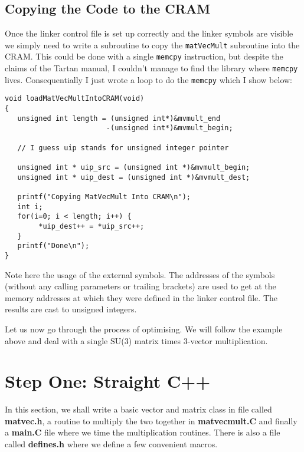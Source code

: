 \subsection{Copying the Code to the CRAM}
Once the linker control file is set up correctly and the linker
symbols are visible we simply need to write a subroutine to copy 
the {\tt matVecMult} subroutine  into the CRAM. This could be done with
a single {\tt memcpy} instruction, but despite the claims of the 
Tartan manual, I couldn't manage to find the library where {\tt memcpy}
lives. Consequentially I just wrote a loop to do the {\tt memcpy} which I
show below:
{\scriptsize
\begin{verbatim}
void loadMatVecMultIntoCRAM(void)
{
   unsigned int length = (unsigned int*)&mvmult_end
                        -(unsigned int*)&mvmult_begin;
	
   // I guess uip stands for unsigned integer pointer

   unsigned int * uip_src = (unsigned int *)&mvmult_begin;
   unsigned int * uip_dest = (unsigned int *)&mvmult_dest;

   printf("Copying MatVecMult Into CRAM\n");
   int i;
   for(i=0; i < length; i++) {
        *uip_dest++ = *uip_src++;
   }    
   printf("Done\n");
}
\end{verbatim}}

Note here the usage of the external symbols. The addresses of the 
symbols (without any calling parameters or trailing brackets) are 
used to get at the memory addresses at which they were defined in
the linker control file. The results are cast to unsigned integers. 

Let us now go through the process of optimising. We will follow the 
example above and deal with a single SU(3) matrix times 3-vector 
multiplication.

\section{Step One: Straight C++}
In this section, we shall write a basic vector and matrix class 
in file called {\bf matvec.h}, a routine to multiply the two together
in {\bf matvecmult.C} and finally a {\bf main.C} file where we
time the multiplication routines. There is also a file called {\bf 
defines.h} where we define a few convenient macros.

